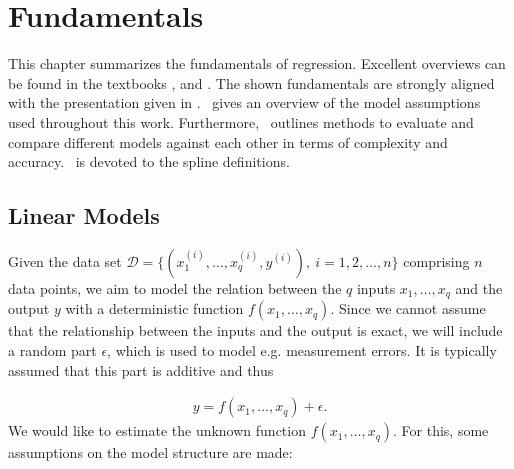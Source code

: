 
\chapter{Fundamentals} \label{cha:fundamentals}

This chapter summarizes the fundamentals of regression. Excellent overviews can be found in the textbooks \cite{fahrmeir2007regression}, \cite{friedman2001elements} and \cite{wood2017generalized}. The shown fundamentals are strongly aligned with the presentation given in \cite{fahrmeir2007regression}.~ gives an overview of the model assumptions used throughout this work. Furthermore,~ outlines methods to evaluate and compare different models against each other in terms of complexity and accuracy.~ is devoted to the  spline definitions.

\section{Linear Models} \label{sec:LinModel}

Given the data set $\mathcal{D} = \{(x^{(i)}_1, \dots, x^{(i)}_q, y^{(i)}), \ i=1,2, \dots, n\}$ comprising $n$ data points, we aim to model the relation between the $q$ inputs $x_1, \dots, x_q$ and the output $y$ with a deterministic function $f(x_1, \dots, x_q)$. Since we cannot assume that the relationship between the inputs and the output is exact, we will include a random part $\epsilon$, which is used to model e.g. measurement errors. It is typically assumed that this part is additive and thus  

\begin{align} \label{eq:model-structure}
	y = f(x_{1}, \dots, x_{q}) + \epsilon.
\end{align}
%
We would like to estimate the unknown function $f(x_1, \dots, x_q)$. For this, some assumptions on the model structure are made:

